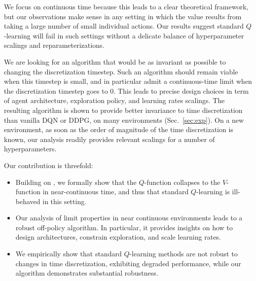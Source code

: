 We focus on continuous time because this leads to a clear theoretical framework,
but our observations make sense in any setting in which the value
results from taking a large number of small individual actions. Our
results suggest standard $Q$-learning will fail in such settings without a
delicate balance of hyperparameter scalings and reparameterizations.

We are looking for an algorithm that would be as invariant as possible to
changing the discretization timestep. Such an 
algorithm should remain viable when this timestep is small, and in particular admit a
continuous-time
limit when the discretization timestep goes to $0$.  This
leads to precise design choices in term of agent architecture, exploration
policy, and learning rates scalings.  The resulting algorithm is shown to
provide better invariance to time discretization than
vanilla DQN or DDPG, on many environments (Sec.~\ref{sec:exp}).  On a new environment, as soon as the
order of magnitude of the time discretization is known, our analysis readily
provides relevant scalings for a number of hyperparameters.


Our contribution is threefold:
\begin{itemize} 
\item Building on \cite{adv_upd}, we formally show that the $Q$-function collapses to the $V$-function in near-continuous time, and thus that
    standard $Q$-learning is ill-behaved in this setting.
  \item Our analysis of limit properties in near continuous environments leads to a robust off-policy algorithm. In particular,
    it provides insights on how to design architectures, constrain exploration, and scale learning rates.
  \item We empirically show that standard $Q$-learning methods are not
  robust to changes in time discretization, exhibiting degraded
  performance, while our algorithm demonstrates
  substantial robustness.
\end{itemize}


